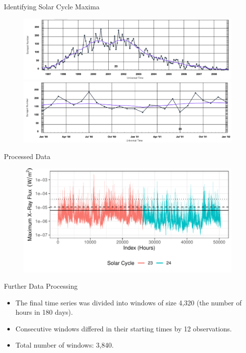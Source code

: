 \documentclass{beamer}
\begin{document}
\begin{frame}{Identifying Solar Cycle Maxima}
    \begin{figure}[h]
    \centering
    \includegraphics[scale=0.25]{figures/solar_cycle_23.png}
    \includegraphics[scale=0.25]{figures/solar_cycle_23_maximum.png}
    \label{fig:solar_cycle_23}
    \end{figure}
\end{frame}

\begin{frame}{Processed Data}
    \begin{figure}[h]
    \centering
    \includegraphics[width=\textwidth]{figures/goes_flux_time_series.pdf}
    \label{fig:goes_flux_time_series}
    \end{figure}
\end{frame}

\begin{frame}{Further Data Processing}
    \begin{itemize}
        \item The final time series was divided into windows of size 4,320 (the number of hours in 180 days).
        \item Consecutive windows differed in their starting times by 12 observations.
        \item Total number of windows: 3,840.
    \end{itemize}
\end{frame}
\end{document}
